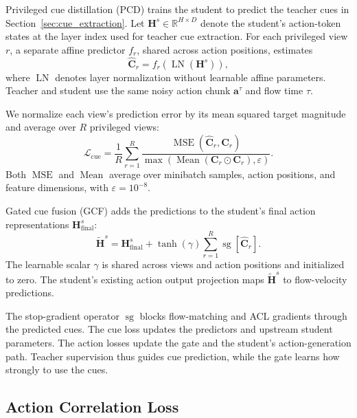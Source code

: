 \documentclass{ELSP}
\begin{document}
Privileged cue distillation (PCD) trains the student to predict
the teacher cues in Section~\ref{sec:cue_extraction}.
Let $\mathbf{H}^s\in\mathbb{R}^{H\times D}$ denote the student's
action-token states at the layer index used for teacher cue
extraction. For each privileged view $r$, a separate
affine predictor $f_r$, shared across action positions, estimates
\begin{equation}
\hat{\mathbf{C}}_r
=
f_r\!\left(\operatorname{LN}(\mathbf{H}^s)\right),
\end{equation}
where $\operatorname{LN}$ denotes layer normalization without
learnable affine parameters. Teacher and student use the same
noisy action chunk $\mathbf{a}^{\tau}$ and flow time $\tau$.

We normalize each view's prediction error by its mean squared
target magnitude and average over $R$ privileged views:
\begin{equation}
\mathcal{L}_{\mathrm{cue}}
=
\frac{1}{R}
\sum_{r=1}^{R}
\frac{
\operatorname{MSE}(\hat{\mathbf{C}}_r,\mathbf{C}_r)
}{
\max\!\left(\operatorname{Mean}(\mathbf{C}_r\odot\mathbf{C}_r),
\varepsilon\right)
}.
\label{eq:cue_loss}
\end{equation}
Both $\operatorname{MSE}$ and $\operatorname{Mean}$ average over
minibatch samples, action positions, and feature dimensions,
with $\varepsilon=10^{-8}$.

Gated cue fusion (GCF) adds the predictions to the student's final action
representations $\mathbf{H}_{\mathrm{final}}^s$:
\begin{equation}
\tilde{\mathbf{H}}^s
=
\mathbf{H}_{\mathrm{final}}^s
+
\tanh(\gamma)
\sum_{r=1}^{R}
\operatorname{sg}\!\left[\hat{\mathbf{C}}_r\right].
\label{eq:cue_fusion}
\end{equation}
The learnable scalar $\gamma$ is shared across views and action
positions and initialized to zero. The student's existing action
output projection maps $\tilde{\mathbf{H}}^s$ to flow-velocity predictions.

The stop-gradient operator $\operatorname{sg}$ blocks flow-matching
and ACL gradients through the predicted cues. The cue loss updates
the predictors and upstream student parameters. The action losses
update the gate and the student's action-generation path. Teacher
supervision thus guides cue prediction, while the gate learns how
strongly to use the cues.

\subsection{Action Correlation Loss}
\label{sec:acl}
\end{document}
